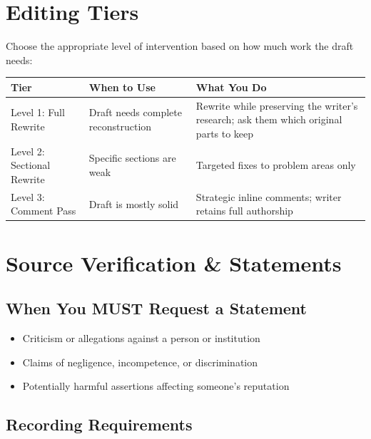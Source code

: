 \documentclass[12pt]{article}
\newlength{\tblwidth}
\begin{document}
\section{Editing Tiers}

Choose the appropriate level of intervention based on how much work the draft needs:

\begin{longtable}{p{0.22\tblwidth} p{0.28\tblwidth} p{0.46\tblwidth}}
\toprule
\textbf{Tier} & \textbf{When to Use} & \textbf{What You Do} \\
\midrule
Level 1: Full Rewrite & Draft needs complete reconstruction & Rewrite while preserving the writer's research; ask them which original parts to keep \\
Level 2: Sectional Rewrite & Specific sections are weak & Targeted fixes to problem areas only \\
Level 3: Comment Pass & Draft is mostly solid & Strategic inline comments; writer retains full authorship \\
\bottomrule
\end{longtable}

\section{Source Verification \& Statements}

\subsection{When You MUST Request a Statement}

\begin{itemize}
    \item Criticism or allegations against a person or institution
    \item Claims of negligence, incompetence, or discrimination
    \item Potentially harmful assertions affecting someone's reputation
\end{itemize}

\subsection{Recording Requirements}
\end{document}
